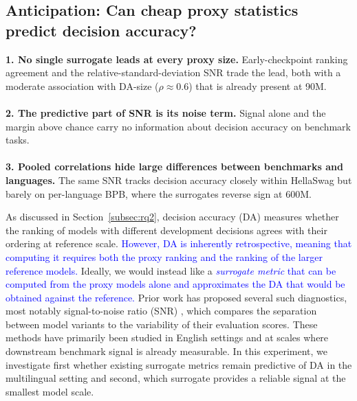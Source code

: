 
\subsection{Anticipation: Can cheap proxy statistics predict decision accuracy?}
\label{subsec:rq3}

\begin{rqfinding}
\textbf{1. No single surrogate leads at every proxy size.} Early-checkpoint ranking agreement and the relative-standard-deviation SNR trade the lead, both with a moderate association with DA-size ($\rho \approx 0.6$) that is already present at 90M.
\\
\\
\textbf{2. The predictive part of SNR is its noise term.} Signal alone and the margin above chance carry no information about decision accuracy on benchmark tasks.
\\
\\
\textbf{3. Pooled correlations hide large differences between benchmarks and languages.} The same SNR tracks decision accuracy closely within HellaSwag but barely on per-language BPB, where the surrogates reverse sign at 600M.
\end{rqfinding}


As discussed in Section~\ref{subsec:rq2}, decision accuracy (DA) measures whether the ranking of models with different development decisions agrees with their ordering at reference scale.
\textcolor{blue}{However, DA is inherently retrospective, meaning that computing it requires both the proxy ranking and the ranking of the larger reference models.}
Ideally, we would instead like a \textcolor{blue}{\textit{surrogate metric} that can be computed from the proxy models alone and approximates the DA that would be obtained against the reference.}
Prior work has proposed several such diagnostics, most notably signal-to-noise ratio (SNR) \citep{heineman_signal_2025}, which compares the separation between model variants to the variability of their evaluation scores.
These methods have primarily been studied in English settings and at scales where downstream benchmark signal is already measurable.
In this experiment, we investigate first whether existing surrogate metrics remain predictive of DA in the multilingual setting and second, which surrogate provides a reliable signal at the smallest model scale.

